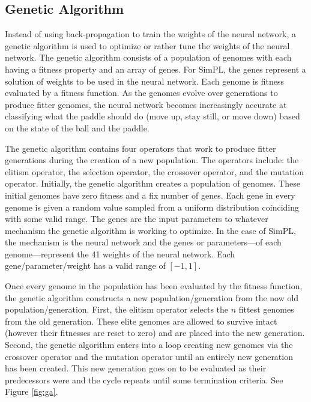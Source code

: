 \documentclass[a4paper,10pt]{article}
\begin{document}
\pagebreak

\subsection{Genetic Algorithm}

Instead of using back-propagation to train the weights of the neural network, a genetic algorithm is used to optimize or rather tune the weights of the neural network. The genetic algorithm consists of a population of genomes with each having a fitness property and an array of genes. For SimPL, the genes represent a solution of weights to be used in the neural network. Each genome is fitness evaluated by a fitness function. As the genomes evolve over generations to produce fitter genomes, the neural network becomes increasingly accurate at classifying what the paddle should do (move up, stay still, or move down) based on the state of the ball and the paddle. 

The genetic algorithm contains four operators that work to produce fitter generations during the creation of a new population. The operators include: the elitism operator, the selection operator, the crossover operator, and the mutation operator. Initially, the genetic algorithm creates a population of genomes. These initial genomes have zero fitness and a fix number of genes. Each gene in every genome is given a random value sampled from a uniform distribution coinciding with some valid range. The genes are the input parameters to whatever mechanism the genetic algorithm is working to optimize. In the case of SimPL, the mechanism is the neural network and the genes or parameters---of each genome---represent the 41 weights of the neural network. Each gene/parameter/weight has a valid range of $[-1,1]$. 

Once every genome in the population has been evaluated by the fitness function, the genetic algorithm constructs a new population/generation from the now old population/generation. First, the elitism operator selects the $n$ fittest genomes from the old generation. These elite genomes are allowed to survive intact (however their fitnesses are reset to zero) and are placed into the new generation. Second, the genetic algorithm enters into a loop creating new genomes via the crossover operator and the mutation operator until an entirely new generation has been created. This new generation goes on to be evaluated as their predecessors were and the cycle repeats until some termination criteria. See Figure \ref{fig:ga}.
\end{document}
